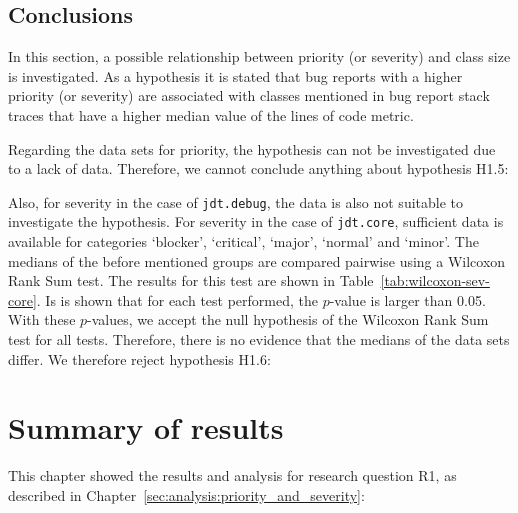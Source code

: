 \subsection{Conclusions} %
In this section, a possible relationship between priority (or severity) and class size is investigated. As a hypothesis it is stated that bug reports with a higher priority (or severity) are associated with classes mentioned in bug report stack traces that have a higher median value of the lines of code metric.

Regarding the data sets for priority, the hypothesis can not be investigated due to a lack of data. Therefore, we cannot conclude anything about hypothesis H1.5:

\vspace{\baselineskip}
\hypae{}
\vspace{\baselineskip}

\noindent
Also, for severity in the case of \texttt{jdt.debug}, the data is also not suitable to investigate the hypothesis. For severity in the case of \texttt{jdt.core}, sufficient data is available for categories `blocker', `critical', `major', `normal' and `minor'. The medians of the before mentioned groups are compared pairwise using a Wilcoxon Rank Sum test. The results for this test are shown in Table~\ref{tab:wilcoxon-sev-core}. Is is shown that for each test performed, the $p$-value is larger than 0.05. With these $p$-values, we accept the null hypothesis of the Wilcoxon Rank Sum test for all tests. Therefore, there is no evidence that the medians of the data sets differ. We therefore reject hypothesis H1.6:

\vspace{\baselineskip}
\hypaf{}
\vspace{\baselineskip}
 


\section{Summary of results} %
\label{sec:priosev-summary_of_results}
This chapter showed the results and analysis for research question R1, as described in Chapter~\ref{sec:analysis:priority_and_severity}:

\vspace{\baselineskip}
\questiona{}
\vspace{\baselineskip}

